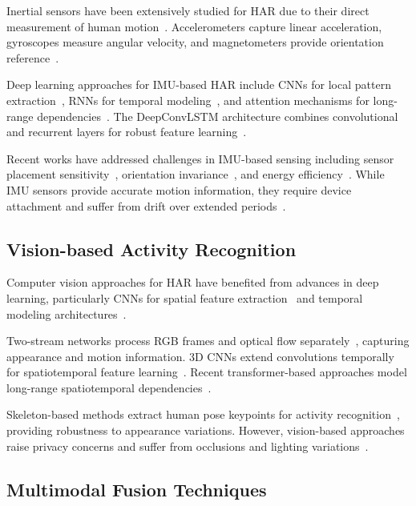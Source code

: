 \documentclass[journal]{IEEEtran}
\begin{document}
Inertial sensors have been extensively studied for HAR due to their direct measurement of human motion~\cite{imu2020survey}. Accelerometers capture linear acceleration, gyroscopes measure angular velocity, and magnetometers provide orientation reference~\cite{sensors2021fundamentals}.

Deep learning approaches for IMU-based HAR include CNNs for local pattern extraction~\cite{cnn2019imu}, RNNs for temporal modeling~\cite{lstm2020har}, and attention mechanisms for long-range dependencies~\cite{transformer2021imu}. The DeepConvLSTM architecture combines convolutional and recurrent layers for robust feature learning~\cite{deepconvlstm2016}.

Recent works have addressed challenges in IMU-based sensing including sensor placement sensitivity~\cite{placement2022}, orientation invariance~\cite{orientation2023}, and energy efficiency~\cite{efficient2024imu}. While IMU sensors provide accurate motion information, they require device attachment and suffer from drift over extended periods~\cite{drift2023correction}.

\subsection{Vision-based Activity Recognition}

Computer vision approaches for HAR have benefited from advances in deep learning, particularly CNNs for spatial feature extraction~\cite{resnet2016} and temporal modeling architectures~\cite{i3d2017, slowfast2019}.

Two-stream networks process RGB frames and optical flow separately~\cite{twostream2014}, capturing appearance and motion information. 3D CNNs extend convolutions temporally for spatiotemporal feature learning~\cite{c3d2015}. Recent transformer-based approaches model long-range spatiotemporal dependencies~\cite{vivit2021, timesformer2021}.

Skeleton-based methods extract human pose keypoints for activity recognition~\cite{stgcn2018, msgcn2020}, providing robustness to appearance variations. However, vision-based approaches raise privacy concerns and suffer from occlusions and lighting variations~\cite{privacy2023vision, occlusion2022}.

\subsection{Multimodal Fusion Techniques}
\end{document}
